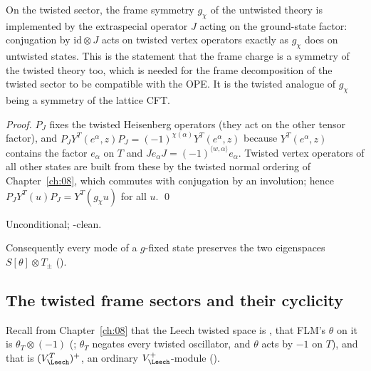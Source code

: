 \begin{physics}
On the twisted sector, the frame symmetry $g_\chi$ of the untwisted theory is implemented by the extraspecial operator $J$ acting on the ground-state factor: conjugation by $\mathrm{id}\otimes J$ acts on twisted vertex operators exactly as $g_\chi$ does on untwisted states. This is the statement that the frame charge is a symmetry of the twisted theory too, which is needed for the frame decomposition of the twisted sector to be compatible with the OPE. It is the twisted analogue of $g_\chi$ being a symmetry of the lattice CFT.
\end{physics}
\emph{Proof.}  $P_J$ fixes the twisted Heisenberg operators (they act on the other tensor factor),
and $P_JY^T(e^\alpha,z)P_J=(-1)^{\chi(\alpha)}Y^T(e^\alpha,z)$ because $Y^T(e^\alpha,z)$ contains the
factor $e_\alpha$ on $T$ and $Je_\alpha J=(-1)^{\langle w,\alpha\rangle}e_\alpha$.  Twisted vertex
operators of all other states are built from these by the twisted normal ordering of
Chapter~\ref{ch:08}, which commutes with conjugation by an involution; hence $P_JY^T(u)P_J=
Y^T(g_\chi u)$ for all $u$. \qed
\begin{status}Unconditional; -clean.\end{status}

Consequently every mode of a $g$-fixed state preserves the two eigenspaces $S[\theta]\otimes T_\pm$
().

\subsection{The twisted frame sectors and their cyclicity}

Recall from Chapter~\ref{ch:08} that the Leech twisted space is ,
that FLM's $\theta$ on it is $\theta_T\otimes(-1)$ (; $\theta_T$ negates every
twisted oscillator, and $\theta$ acts by $-1$ on $T$), and that 
is $(V_\Leech^T)^+$, an ordinary $V_\Leech^+$-module ().

